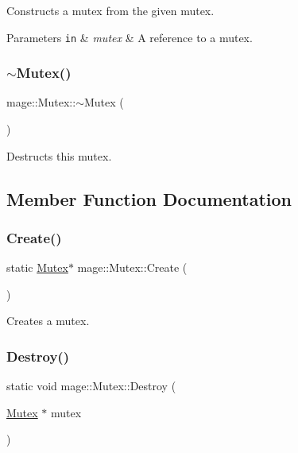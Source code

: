 Constructs a mutex from the given mutex.


\begin{DoxyParams}[1]{Parameters}
\mbox{\tt in}  & {\em mutex} & A reference to a mutex. \\
\hline
\end{DoxyParams}
\hypertarget{classmage_1_1_mutex_a143d82ec7bb43f953a1703caa7972e9d}{}\label{classmage_1_1_mutex_a143d82ec7bb43f953a1703caa7972e9d} 
\subsubsection{\texorpdfstring{$\sim$\+Mutex()}{~Mutex()}}
{\footnotesize\ttfamily mage\+::\+Mutex\+::$\sim$\+Mutex (\begin{DoxyParamCaption}{ }\end{DoxyParamCaption})\hspace{0.3cm}{\ttfamily [private]}}

Destructs this mutex. 

\subsection{Member Function Documentation}
\hypertarget{classmage_1_1_mutex_a48d784fa6bffd4088d9f89a2a9cca84e}{}\label{classmage_1_1_mutex_a48d784fa6bffd4088d9f89a2a9cca84e} 
\subsubsection{\texorpdfstring{Create()}{Create()}}
{\footnotesize\ttfamily static \hyperlink{classmage_1_1_mutex}{Mutex}$\ast$ mage\+::\+Mutex\+::\+Create (\begin{DoxyParamCaption}{ }\end{DoxyParamCaption})\hspace{0.3cm}{\ttfamily [static]}}

Creates a mutex. \hypertarget{classmage_1_1_mutex_a78cd1aff434b1d7cefce4c8339c25d8f}{}\label{classmage_1_1_mutex_a78cd1aff434b1d7cefce4c8339c25d8f} 
\subsubsection{\texorpdfstring{Destroy()}{Destroy()}}
{\footnotesize\ttfamily static void mage\+::\+Mutex\+::\+Destroy (\begin{DoxyParamCaption}\item[{\hyperlink{classmage_1_1_mutex}{Mutex} $\ast$}]{mutex }\end{DoxyParamCaption})\hspace{0.3cm}{\ttfamily [static]}}

